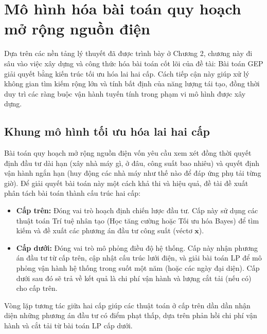 {\let\clearpage\relax
\chapter{Mô hình hóa bài toán quy hoạch mở rộng nguồn điện}}
\label{chap:problem-modeling}

Dựa trên các nền tảng lý thuyết đã được trình bày ở Chương 2, chương này đi sâu vào việc xây dựng và công thức hóa bài toán cốt lõi của đề tài: Bài toán GEP giải quyết bằng kiến trúc tối ưu hóa lai hai cấp. Cách tiếp cận này giúp xử lý không gian tìm kiếm rộng lớn và tính bất định của năng lượng tái tạo, đồng thời duy trì các ràng buộc vận hành tuyến tính trong phạm vi mô hình được xây dựng.

\section{Khung mô hình tối ưu hóa lai hai cấp}

Bài toán quy hoạch mở rộng nguồn điện vốn yêu cầu xem xét đồng thời quyết định đầu tư dài hạn (xây nhà máy gì, ở đâu, công suất bao nhiêu) và quyết định vận hành ngắn hạn (huy động các nhà máy như thế nào để đáp ứng phụ tải từng giờ). Để giải quyết bài toán này một cách khả thi và hiệu quả, đề tài đề xuất phân tách bài toán thành cấu trúc hai cấp:

\begin{itemize}
    \item \textbf{Cấp trên:} Đóng vai trò hoạch định chiến lược đầu tư. Cấp này sử dụng các thuật toán Trí tuệ nhân tạo (Học tăng cường hoặc Tối ưu hóa Bayes) để tìm kiếm và đề xuất các phương án đầu tư công suất (véctơ $\mathbf{x}$).
    \item \textbf{Cấp dưới:} Đóng vai trò mô phỏng điều độ hệ thống. Cấp này nhận phương án đầu tư từ cấp trên, cập nhật cấu trúc lưới điện, và giải bài toán LP để mô phỏng vận hành hệ thống trong suốt một năm (hoặc các ngày đại diện). Cấp dưới sau đó sẽ trả về kết quả là chi phí vận hành và lượng cắt tải (nếu có) cho cấp trên.
\end{itemize}

Vòng lặp tương tác giữa hai cấp giúp các thuật toán ở cấp trên dần dần nhận diện những phương án đầu tư có điểm phạt thấp, dựa trên phản hồi chi phí vận hành và cắt tải từ bài toán LP cấp dưới.

